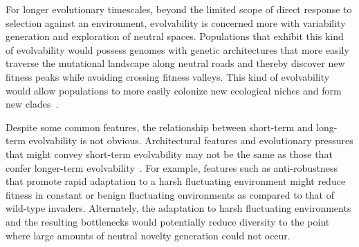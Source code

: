 \documentclass[PhD]{msu-thesis}
\begin{document}
For longer evolutionary timescales, beyond the limited scope of direct response to selection against an environment, 
evolvability is concerned more with variability generation and exploration of neutral spaces.
Populations that exhibit this kind of evolvability would possess genomes with genetic architectures
that more easily traverse the mutational landscape along neutral roads and thereby discover new fitness peaks while avoiding crossing fitness valleys.
This kind of evolvability would allow populations to more easily colonize new ecological niches and form new clades~\cite{kirschner_evolvability_1998,brookfield_evolution:_2001}.

Despite some common features, the relationship between short-term and long-term evolvability is not obvious. Architectural features and evolutionary pressures that might convey short-term evolvability may not be the same as those that confer longer-term evolvability~\cite{pigliucci_is_2008}. For example, features such as anti-robustness that promote rapid adaptation to a harsh fluctuating environment might reduce fitness in constant or benign fluctuating environments as compared to that of wild-type invaders. Alternately, the adaptation to harsh fluctuating environments and the resulting bottlenecks would potentially reduce diversity to the point where large amounts of neutral novelty generation could not occur. 
\end{document}
